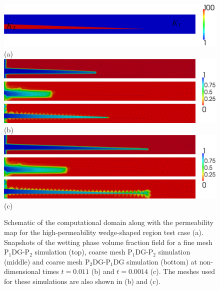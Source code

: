 \documentclass[preprint,authoryear,12pt]{elsarticle}
\newcommand{\PN}[2][error]{P$_{#1}$DG-P$_{#2}$}
\begin{document}
\begin{figure}[h!]
  \vbox{
    \hbox{
      \hspace{-0.cm}\includegraphics[width=1.0\textwidth]{wedge_permeabilityv2}}
    \vspace{-1.cm}\hbox{\hspace{4cm}(a)}
    \vspace{.5cm}
    \hbox{
      \hspace{-0.cm}\includegraphics[width=1.0\textwidth]{wedge_0011}}
    \vspace{-0.cm}\hbox{\hspace{4cm}(b)}
    \vspace{.5cm}
    \hbox{
      \hspace{-.cm}\includegraphics[width=1.0\textwidth]{wedge_0014}}
    \vspace{-0.cm}\hbox{\hspace{4cm}(c)}
  }
  \caption{Schematic of the computational domain along with the
    permeability map for the high-permeability wedge-shaped region
    test case (a). Snapshots of the wetting phase volume fraction
    field for a fine mesh \PN[1]{2} simulation (top), coarse mesh
    \PN[1]{2} simulation (middle) and coarse mesh \PN[2]{1}DG
    simulation (bottom) at non-dimensional times $t = 0.011$ (b) and
    $t=0.0014$ (c). The meshes used for these simulations are also
    shown in (b) and (c).
    \label{fig:wedge_permeability}}
\end{figure}
\end{document}
